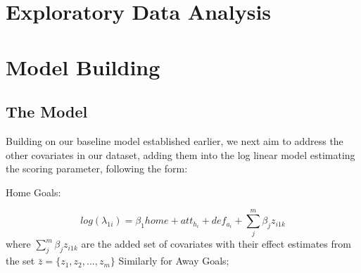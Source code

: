 \documentclass[
]{article}
\begin{document}
\hypertarget{exploratory-data-analysis}{%
\section{Exploratory Data Analysis}\label{exploratory-data-analysis}}

\hypertarget{section}{%
\subsection{}\label{section}}

\hypertarget{section-1}{%
\subsection{}\label{section-1}}

\hypertarget{section-2}{%
\subsection{}\label{section-2}}

\hypertarget{section-3}{%
\subsection{}\label{section-3}}

\hypertarget{section-4}{%
\subsection{}\label{section-4}}

\hypertarget{model-building}{%
\section{Model Building}\label{model-building}}

\hypertarget{the-model}{%
\subsection{The Model}\label{the-model}}

Building on our baseline model established earlier, we next aim to
address the other covariates in our dataset, adding them into the log
linear model estimating the scoring parameter, following the form:

Home Goals:

\[log(\lambda_{1i}) = \beta_1 home + att_{h_i} + def_{a_i} + \sum^m_j\beta_jz_{i1k}\]
where \(\sum^m_j\beta_jz_{i1k}\) are the added set of covariates with
their effect estimates from the set \(\bar{z}= \{ {z_1,z_2,...,z_m} \}\)
Similarly for Away Goals;
\end{document}
